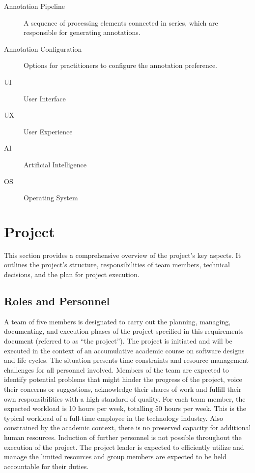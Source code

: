 \documentclass[12pt]{article}
\begin{document}
\begin{description}
    \item[Annotation Pipeline] A sequence of processing elements connected in series, which are responsible for generating annotations.
    \item[Annotation Configuration] Options for practitioners to configure the annotation preference.
    \item[UI] User Interface
    \item[UX] User Experience
    \item[AI] Artificial Intelligence
    \item[OS] Operating System 
\end{description}

\section{Project}
This section provides a comprehensive overview of the project’s key aspects. It outlines the project’s structure, responsibilities of team members, technical decisions, and the plan for project execution.
\subsection{Roles and Personnel}
A team of five members is designated to carry out the planning, managing, documenting, and execution phases of the project specified in this requirements document (referred to as “the project”). The project is initiated and will be executed in the context of an accumulative academic course on software designs and life cycles. The situation presents time constraints and resource management challenges for all personnel involved. Members of the team are expected to identify potential problems that might hinder the progress of the project, voice their concerns or suggestions, acknowledge their shares of work and fulfill their own responsibilities with a high standard of quality. For each team member, the expected workload is 10 hours per week, totalling 50 hours per week. This is the typical workload of a full-time employee in the technology industry. Also constrained by the academic context, there is no preserved capacity for additional human resources. Induction of further personnel is not possible throughout the execution of the project. The project leader is expected to efficiently utilize and manage the limited resources and group members are expected to be held accountable for their duties.
\end{document}
